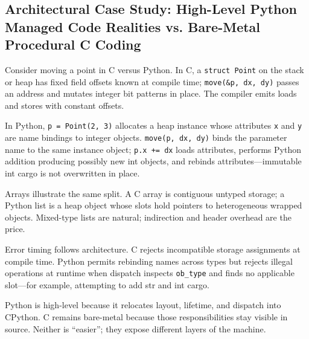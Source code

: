 \subsection{Architectural Case Study: High-Level Python Managed Code Realities vs. Bare-Metal Procedural C Coding}

Consider moving a point in C versus Python. In C, a \texttt{struct Point} on the stack or heap has fixed field offsets known at compile time; \texttt{move(\&p, dx, dy)} passes an address and mutates integer bit patterns in place. The compiler emits loads and stores with constant offsets.

In Python, \texttt{p = Point(2, 3)} allocates a heap instance whose attributes \texttt{x} and \texttt{y} are name bindings to integer objects. \texttt{move(p, dx, dy)} binds the parameter name to the same instance object; \texttt{p.x += dx} loads attributes, performs Python addition producing possibly new int objects, and rebinds attributes---immutable int cargo is not overwritten in place.

Arrays illustrate the same split. A C array is contiguous untyped storage; a Python list is a heap object whose slots hold pointers to heterogeneous wrapped objects. Mixed-type lists are natural; indirection and header overhead are the price.

Error timing follows architecture. C rejects incompatible storage assignments at compile time. Python permits rebinding names across types but rejects illegal operations at runtime when dispatch inspects \texttt{ob\_type} and finds no applicable slot---for example, attempting to add str and int cargo.

Python is high-level because it relocates layout, lifetime, and dispatch into CPython. C remains bare-metal because those responsibilities stay visible in source. Neither is ``easier''; they expose different layers of the machine.
